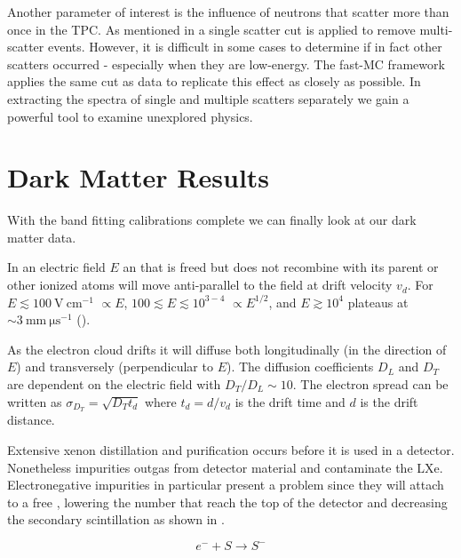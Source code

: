 Another parameter of interest is the influence of neutrons that scatter more than once in the TPC.  As mentioned in
 a single scatter cut is applied to remove multi-scatter events.  However,
it is difficult in some cases to determine if in fact other scatters occurred - especially when they are low-energy.  The fast-MC
framework applies the same cut as data to replicate this effect as closely as possible.  In extracting the spectra of single and multiple
scatters separately we gain a powerful tool to examine unexplored physics.



\section{Dark Matter Results}
\label{sec:dark_matter_results}
With the band fitting calibrations complete we can finally look at our dark matter data.









In an electric field $E$ an \electron that is freed but does not recombine with its parent or other ionized atoms will move anti-parallel
to the field at drift velocity $v_{d}$.  For $E \lesssim 100\ \mathrm{V\ cm^{-1}}$ \vd$\propto E$, $100 \lesssim E \lesssim 10^{3-4}$
\vd$\propto E^{1/2}$, and $E \gtrsim 10^{4}$ \vd plateaus at $\sim 3\ \mathrm{mm\ \mu s^{-1}}$ ().


As the electron cloud drifts it will diffuse both longitudinally (in the direction of $E$) and transversely (perpendicular to $E$).  The
diffusion coefficients $D_{L}$ and $D_{T}$ are dependent on the electric field with $D_{T}/D_{L} \sim 10$.  The electron spread can
be written as $\sigma_{D_{T}} = \sqrt{D_{T} t_{d}}$ where $t_{d} = d/v_{d}$ is the drift time and $d$ is the drift distance.

Extensive xenon distillation and purification occurs before it is used in a detector.  Nonetheless impurities outgas from detector
material and contaminate the LXe.  Electronegative impurities in particular present a problem since they will attach to a free \electron,
lowering the number that reach the top of the detector and decreasing the secondary scintillation as shown in .

\begin{equation}
e^{-} + S \rightarrow S^{-}
\label{eq:impurity_attach}
\end{equation}


